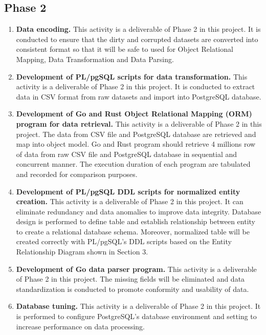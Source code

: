 \subsection{Phase 2}

\begin{enumerate}[topsep=0pt,itemsep=-1ex,partopsep=1ex,parsep=1.5ex]
	
	\item \textbf{Data encoding.}
	This activity is a deliverable of Phase 2 in this project. It is conducted to ensure that the dirty and corrupted datasets are converted into consistent format so that it will be safe to used for Object Relational Mapping, Data Transformation and Data Parsing. 
	
	\item \textbf{Development of PL/pgSQL scripts for data transformation.} 
	This activity is a deliverable of Phase 2 in this project. It is conducted to extract data in CSV format from raw datasets and import into PostgreSQL database. 
	
	\item \textbf{Development of Go and Rust Object Relational Mapping (ORM) program for data retrieval.}
	This activity is a deliverable of Phase 2 in this project. The data from CSV file and PostgreSQL database are retrieved and map into object model. Go and Rust program should retrieve 4 millions row of data from raw CSV file and PostgreSQL database in sequential and concurrent manner. The execution duration of each program are tabulated and recorded for comparison purposes. 
	
	\item \textbf{Development of PL/pgSQL DDL scripts for normalized entity creation.}
	This activity is a deliverable of Phase 2 in this project. It can eliminate redundancy and data anomalies to improve data integrity. Database design is performed to define table and establish relationship between entity to create a relational database schema. Moreover, normalized table will be created correctly with PL/pgSQL's DDL scripts based on the Entity Relationship Diagram shown in Section 3.
	
	\item \textbf{Development of Go data parser program.}
	This activity is a deliverable of Phase 2 in this project. The missing fields will be eliminated and data standardization is conducted to promote conformity and usability of data. 
	
	\item \textbf{Database tuning.}
	This activity is a deliverable of Phase 2 in this project. It is performed to configure PostgreSQL's database environment and setting to increase performance on data processing. 
	

\end{enumerate}
